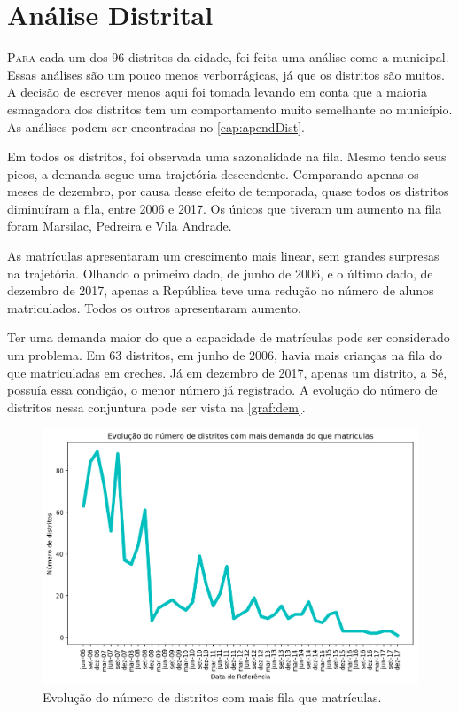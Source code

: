 \chapter{Análise Distrital}
\label{cap:dist}

\lettrine{P}{ara} cada um dos 96 distritos da cidade, foi feita uma análise como a municipal. Essas análises são um pouco menos verborrágicas, já que os distritos são muitos. A decisão de escrever menos aqui foi tomada levando em conta que a maioria esmagadora dos distritos tem um comportamento muito semelhante ao município. As análises podem ser encontradas no \autoref{cap:apendDist}.

Em todos os distritos, foi observada uma sazonalidade na fila. Mesmo tendo seus picos, a demanda segue uma trajetória descendente. Comparando apenas os meses de dezembro, por causa desse efeito de temporada, quase todos os distritos diminuíram a fila, entre 2006 e 2017. Os únicos que tiveram um aumento na fila foram Marsilac, Pedreira e Vila Andrade.

As matrículas apresentaram um crescimento mais linear, sem grandes surpresas na trajetória. Olhando o primeiro dado, de junho de 2006, e o último dado, de dezembro de 2017, apenas a República teve uma redução no número de alunos matriculados. Todos os outros apresentaram aumento.

Ter uma demanda maior do que a capacidade de matrículas pode ser considerado um problema. Em 63 distritos, em junho de 2006, havia mais crianças na fila do que matriculadas em creches. Já em dezembro de 2017, apenas um distrito, a Sé, possuía essa condição, o menor número já registrado. A evolução do número de distritos nessa conjuntura pode ser vista na \autoref{graf:dem}.

\begin{figure}
	\centering
	\includegraphics[width=.8\linewidth]{grafdem}
	\caption{Evolução do número de distritos com mais fila que matrículas.}
	\label{graf:dem}
\end{figure}

